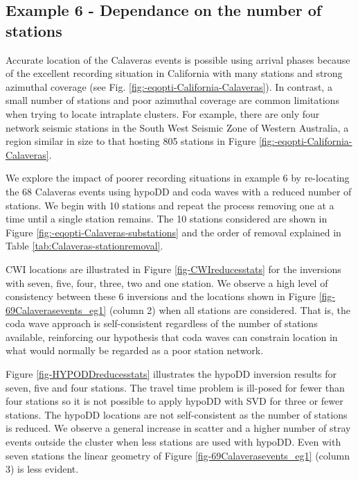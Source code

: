 \documentclass[12pt,double]{article}
\begin{document}
\subsection*{Example 6 - Dependance on the number of stations}


Accurate location of the Calaveras events is possible using arrival
phases because of the excellent recording situation in California
with many stations and strong azimuthal coverage (see Fig.
\ref{fig:-eqopti-California-Calaveras}). In contrast, a small number
of stations and poor azimuthal coverage are common limitations when
trying to locate intraplate clusters. For example, there are only
four network seismic stations in the South West Seismic Zone of
Western Australia, a region similar in size to that hosting 805
stations in Figure \ref{fig:-eqopti-California-Calaveras}.

We explore the impact of poorer recording situations in example 6 by
re-locating the 68 Calaveras events  using hypoDD and coda waves
with a reduced number of stations. We begin with 10 stations and
repeat the process removing one at a time until a single station
remains. The 10 stations considered are shown in Figure
\ref{fig:-eqopti-Calaveras-substations} and the order of removal
explained in Table \ref{tab:Calaveras-stationremoval}.

CWI locations are illustrated in Figure \ref{fig-CWIreducesstats}
for the inversions with seven, five, four, three, two and one
station. We observe a high level of consistency between these 6
inversions and the locations shown in Figure
\ref{fig-69Calaverasevents_eg1} (column 2) when all stations are
considered. That is, the coda wave approach is self-consistent
regardless of the number of stations available, reinforcing our
hypothesis that coda waves can constrain location in what would
normally be regarded as a poor station network.


Figure \ref{fig-HYPODDreducesstats} illustrates the hypoDD inversion
results for seven, five and four stations. The travel time problem
is ill-posed for fewer than four stations so it is not possible to
apply hypoDD with SVD for three or fewer stations.  The hypoDD
locations are not self-consistent as the number of stations is
reduced. We observe a general increase in scatter and a higher
number of stray events outside the cluster when less stations are
used with hypoDD. Even with seven stations the linear geometry of
Figure \ref{fig-69Calaverasevents_eg1} (column 3) is less evident.
\end{document}
